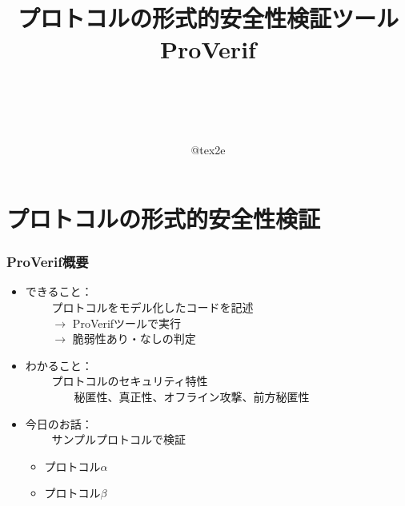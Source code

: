 \documentclass[dvipdfmx, dvipsnames, 11pt]{beamer}
\title{~\\~\\~\\~\\プロトコルの形式的安全性検証ツール\\ProVerif}
\subtitle{}
\author{~\\~\\~\\~\\@tex2e}
\date{}
\begin{document}
\begin{frame}[plain]
  \frametitle{}
  \titlepage %
\end{frame}

\section{プロトコルの形式的安全性検証}

\begin{frame}[fragile]
  \frametitle{ProVerif概要}
  \vspace{1em}

  \begin{itemize}
    \item できること：
      \\~~~~ プロトコルをモデル化したコードを記述 
      \\~~~~ $\rightarrow$ ProVerifツールで実行
      \\~~~~ $\rightarrow$ 脆弱性あり・なしの判定
    \vspace{1em}
    \item わかること：
      \\~~~~ プロトコルのセキュリティ特性
      \\~~~~~~~~ 秘匿性、{\color{gray}真正性}、オフライン攻撃、前方秘匿性
    \vspace{1em}
    \item 今日のお話：
      \\~~~~ サンプルプロトコルで検証
      \begin{itemize}
        \item プロトコル$\alpha$
        \item プロトコル$\beta$
      \end{itemize}
  \end{itemize}
\end{frame}
\end{document}
